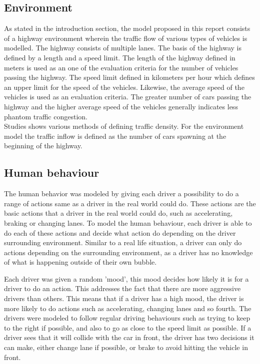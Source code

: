 \subsection{Environment}
As stated in the introduction section, the model proposed in this report consists of a highway environment wherein the traffic flow of various types of vehicles is modelled. The highway consists of multiple lanes. The basis of the highway is defined by a length and a speed limit. The length of the highway defined in meters is used as an one of the evaluation criteria for the number of vehicles passing the highway. The speed limit defined in kilometers per hour which defines an upper limit for the speed of the vehicles. Likewise, the average speed of the vehicles is used as an evaluation criteria. The greater number of cars passing the highway and the higher average speed of the vehicles generally indicates less phantom traffic congestion.\\
Studies shows various methods of defining traffic density. \cite{YANG2017344} For the environment model the traffic inflow is defined as the number of cars spawning at the beginning of the highway. 

\subsection{Human behaviour}
\label{HumanBehaviour}
The human behavior was modeled by giving each driver a possibility to do a range of actions same as a driver in the real world could do. These actions are the basic actions that a driver in the real world could do, such as accelerating, braking or changing lanes. To model the human behaviour, each driver is able to do each of these actions and decide what action do depending on the driver surrounding environment. Similar to a real life situation, a driver can only do actions depending on the surrounding environment, as a driver has no knowledge of what is happening outside of their own bubble. 

Each driver was given a random 'mood', this mood decides how likely it is for a driver to do an action. This addresses the fact that there are more aggressive drivers than others. This means that if a driver has a high mood, the driver is more likely to do actions such as accelerating, changing lanes and so fourth. 
The drivers were modeled to follow regular driving behaviours such as trying to keep to the right if possible, and also to go as close to the speed limit as possible. If a driver sees that it will collide with the car in front, the driver has two decisions it can make, either change lane if possible, or brake to avoid hitting the vehicle in front. 

